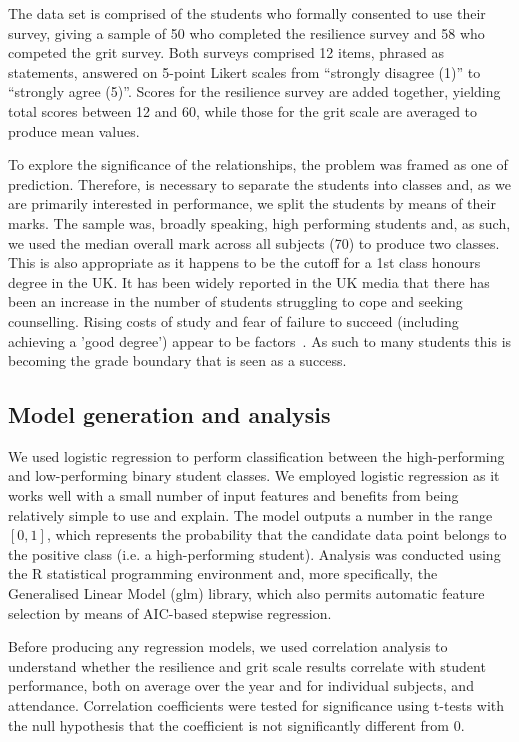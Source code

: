 \documentclass[sigconf]{acmart}
\begin{document}
The data set is comprised of the students who formally consented to use their survey, giving a sample of 50 who completed the resilience survey and 58 who competed the grit survey. Both surveys comprised 12 items, phrased as statements, answered on 5-point Likert scales from ``strongly disagree (1)'' to ``strongly agree (5)''. Scores for the resilience survey are added together, yielding total scores between 12 and 60, while those for the grit scale are averaged to produce mean values.

To explore the significance of the relationships, the problem was framed as one of prediction. Therefore, is necessary to separate the students into classes and, as we are primarily interested in performance, we split the students by means of their marks. The sample was, broadly speaking, high performing students and, as such, we used the median overall mark across all subjects (70) to produce two classes. This is also appropriate as it happens to be the cutoff for a 1st class honours degree in the UK. It has been widely reported in the UK media that there has been an increase in the number of students struggling to cope and seeking counselling. Rising costs of study and fear of failure to succeed (including achieving a 'good degree') appear to be factors~\cite{BBC}. As such to many students this is becoming the grade boundary that is seen as a success.

\subsection{Model generation and analysis}
We used logistic regression to perform classification between the high-performing and low-performing binary student classes. We employed logistic regression as it works well with a small number of input features and benefits from being relatively simple to use and explain. The model outputs a number in the range $[0,1]$, which represents the probability that the candidate data point belongs to the positive class (i.e. a high-performing student). Analysis was conducted using the R statistical programming environment and, more specifically, the Generalised Linear Model (glm) library, which also permits automatic feature selection by means of AIC-based stepwise regression.

Before producing any regression models, we used correlation analysis to understand whether the resilience and grit scale results correlate with student performance, both on average over the year and for individual subjects, and attendance. Correlation coefficients were tested for significance using t-tests with the null hypothesis that the coefficient is not significantly different from 0. 
\end{document}
